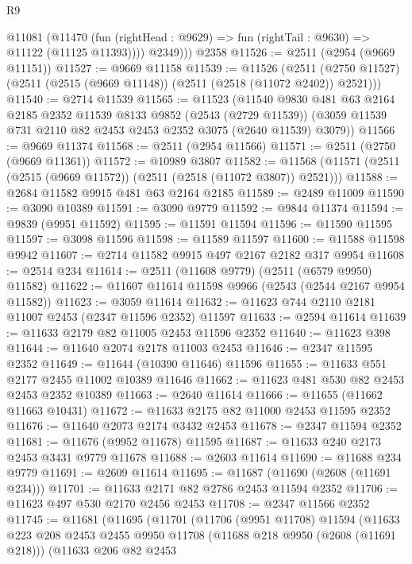\begin{lexlean}{R9}
\begin{coremodule}
        @11081
          (@11470 (fun (rightHead : @9629) => fun (rightTail : @9630) => @11122 (@11125 @11393))))
          @2349)))
    @2358
@11526 := @2511 (@2954 (@9669 @11151))
@11527 := @9669 @11158
@11539 := @11526
    (@2511 (@2750 @11527) (@2511 (@2515 (@9669 @11148)) (@2511 (@2518 (@11072 @2402)) @2521)))
@11540 := @2714 @11539
@11565 := @11523
    (@11540
      @9830
      @481
      @63
      @2164
      @2185
      @2352
      @11539
      @8133
      @9852
      (@2543 (@2729 @11539))
      (@3059 @11539 @731 @2110 @82 @2453 @2453 @2352 @3075 (@2640 @11539) @3079))
@11566 := @9669 @11374
@11568 := @2511 (@2954 @11566)
@11571 := @2511 (@2750 (@9669 @11361))
@11572 := @10989 @3807
@11582 := @11568 (@11571 (@2511 (@2515 (@9669 @11572)) (@2511 (@2518 (@11072 @3807)) @2521)))
@11588 := @2684 @11582 @9915 @481 @63 @2164 @2185
@11589 := @2489 @11009
@11590 := @3090 @10389
@11591 := @3090 @9779
@11592 := @9844 @11374
@11594 := @9839 (@9951 @11592)
@11595 := @11591 @11594
@11596 := @11590 @11595
@11597 := @3098 @11596
@11598 := @11589 @11597
@11600 := @11588 @11598 @9942
@11607 := @2714 @11582 @9915 @497 @2167 @2182 @317 @9954
@11608 := @2514 @234
@11614 := @2511 (@11608 @9779) (@2511 (@6579 @9950) @11582)
@11622 := @11607 @11614 @11598 @9966 (@2543 (@2544 @2167 @9954 @11582))
@11623 := @3059 @11614
@11632 := @11623 @744 @2110 @2181 @11007 @2453 (@2347 @11596 @2352) @11597
@11633 := @2594 @11614
@11639 := @11633 @2179 @82 @11005 @2453 @11596 @2352
@11640 := @11623 @398
@11644 := @11640 @2074 @2178 @11003 @2453
@11646 := @2347 @11595 @2352
@11649 := @11644 (@10390 @11646) @11596
@11655 := @11633 @551 @2177 @2455 @11002 @10389 @11646
@11662 := @11623 @481 @530 @82 @2453 @2453 @2352 @10389
@11663 := @2640 @11614
@11666 := @11655 (@11662 @11663 @10431)
@11672 := @11633 @2175 @82 @11000 @2453 @11595 @2352
@11676 := @11640 @2073 @2174 @3432 @2453
@11678 := @2347 @11594 @2352
@11681 := @11676 (@9952 @11678) @11595
@11687 := @11633 @240 @2173 @2453 @3431 @9779 @11678
@11688 := @2603 @11614
@11690 := @11688 @234 @9779
@11691 := @2609 @11614
@11695 := @11687 (@11690 (@2608 (@11691 @234)))
@11701 := @11633 @2171 @82 @2786 @2453 @11594 @2352
@11706 := @11623 @497 @530 @2170 @2456 @2453
@11708 := @2347 @11566 @2352
@11745 := @11681
    (@11695
      (@11701
        (@11706
          (@9951 @11708)
          @11594
          (@11633
            @223
            @208
            @2453
            @2455
            @9950
            @11708
            (@11688 @218 @9950 (@2608 (@11691 @218)))
            (@11633
              @206
              @82
              @2453

\end{coremodule}
\end{lexlean}
